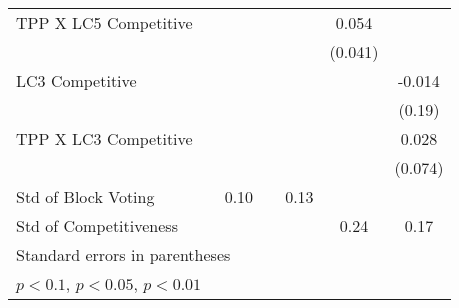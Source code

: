 {\begin{tabular}{l*{6}{c}}
TPP X LC5 Competitive&                  &                  &                  &                  &    0.054         &                  \\
                &                  &                  &                  &                  &  (0.041)         &                  \\
LC3 Competitive &                  &                  &                  &                  &                  &   -0.014         \\
                &                  &                  &                  &                  &                  &   (0.19)         \\
TPP X LC3 Competitive&                  &                  &                  &                  &                  &    0.028         \\
                &                  &                  &                  &                  &                  &  (0.074)         \\
\midrule
Std of Block Voting&                  &     0.10         &                  &     0.13         &                  &                  \\
Std of Competitiveness&                  &                  &                  &                  &     0.24         &     0.17         \\
\bottomrule
\multicolumn{7}{l}{\footnotesize Standard errors in parentheses}\\
\multicolumn{7}{l}{\footnotesize \sym{*} \(p<0.1\), \sym{**} \(p<0.05\), \sym{***} \(p<0.01\)}\\
\end{tabular}
}
